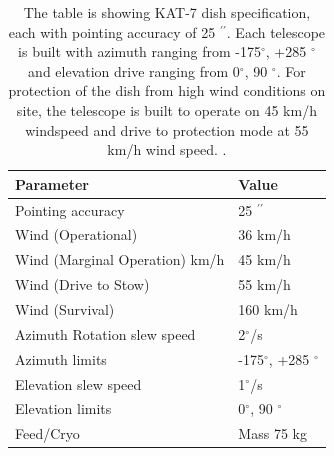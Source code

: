 \begin{table}[H]\centering
\begin{tabular}{l l }
\toprule
\textbf{Parameter} & \textbf{Value}\\
\midrule
Pointing accuracy & 25 $^{\prime \prime}$ \\
Wind (Operational) & 36 km/h\\
Wind (Marginal Operation) km/h & 45 km/h\\
Wind (Drive to Stow) & 55 km/h\\
Wind (Survival) & 160 km/h\\
Azimuth Rotation slew speed &  2$^\circ$/s\\
Azimuth limits & -175$^{\circ}$, +285 $^{\circ}$\\
Elevation slew speed & 1$^{\circ}$/s\\
Elevation limits & 0$^{\circ}$, 90 $^{\circ}$\\
Feed/Cryo & Mass 75 kg\\
\bottomrule
\end{tabular}
\caption{The table is showing KAT-7 dish specification, each with pointing accuracy of 25 $^{\prime \prime}$. Each telescope is built with azimuth ranging from -175$^{\circ}$, +285 $^{\circ}$ and elevation drive ranging from 0$^{\circ}$, 90 $^{\circ}$. For protection of the dish from high wind conditions on site, the telescope is built to operate on 45 km/h windspeed and drive to protection mode at 55 km/h wind speed. \citep{foley2016engineering}.}
\label{DSpec}
\end{table}

